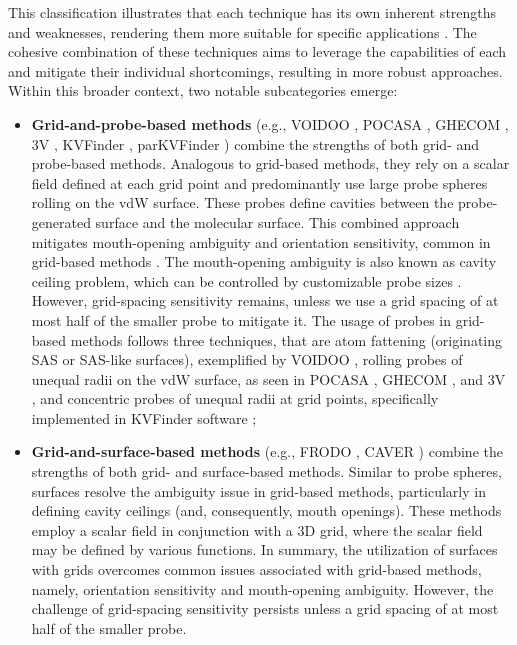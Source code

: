 \documentclass[Ingles]{phdthesis}
\def\eg{e.g.\onedot}
\begin{document}
This classification illustrates that each technique has its own inherent strengths and weaknesses, rendering them more suitable for specific applications \cite{simoes2017,guerra2020}. The cohesive combination of these techniques aims to leverage the capabilities of each and mitigate their individual shortcomings, resulting in more robust approaches. Within this broader context, two notable subcategories emerge:

\begin{itemize}
  \item \textbf{Grid-and-probe-based methods} (\eg, VOIDOO \cite{voidoo}, POCASA \cite{pocasa}, GHECOM \cite{ghecom}, 3V \cite{3v}, KVFinder \cite{oliveira2014}, parKVFinder \cite{guerra2019,guerra2020}) combine the strengths of both grid- and probe-based methods. Analogous to grid-based methods, they rely on a scalar field defined at each grid point and predominantly use large probe spheres rolling on the vdW surface. These probes define cavities between the probe-generated surface and the molecular surface. This combined approach mitigates mouth-opening ambiguity and orientation sensitivity, common in grid-based methods \cite{simoes2017}. The mouth-opening ambiguity is also known as cavity ceiling problem, which can be controlled by customizable probe sizes \cite{simoes2017,oliveira2014}. However, grid-spacing sensitivity remains, unless we use a grid spacing of at most half of the smaller probe to mitigate it. The usage of probes in grid-based methods follows three techniques, that are atom fattening (originating SAS or SAS-like surfaces), exemplified by VOIDOO \cite{voidoo}, rolling probes of unequal radii on the vdW surface, as seen in POCASA \cite{pocasa}, GHECOM \cite{ghecom}, and 3V \cite{3v}, and concentric probes of unequal radii at grid points, specifically implemented in KVFinder software \cite{oliveira2014};
  \item \textbf{Grid-and-surface-based methods} (\eg, FRODO \cite{frodo}, CAVER \cite{caver}) combine the strengths of both grid- and surface-based methods. Similar to probe spheres, surfaces resolve the ambiguity issue in grid-based methods, particularly in defining cavity ceilings (and, consequently, mouth openings). These methods employ a scalar field in conjunction with a 3D grid, where the scalar field may be defined by various functions. In summary, the utilization of surfaces with grids overcomes common issues associated with grid-based methods, namely, orientation sensitivity and mouth-opening ambiguity. However, the challenge of grid-spacing sensitivity persists unless a grid spacing of at most half of the smaller probe.
\end{itemize}
\end{document}
